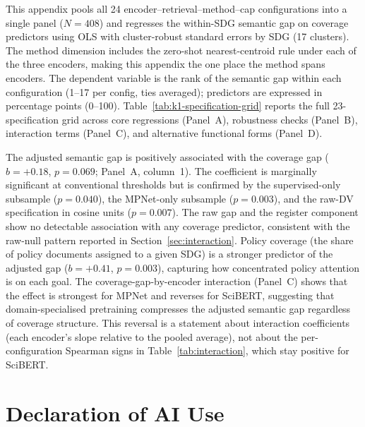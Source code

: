\documentclass[12pt,a4paper]{article}
\let\OldSection\section
\renewcommand{\section}{\clearpage\FloatBarrier\OldSection}
\begin{document}
This appendix pools all 24 encoder--retrieval--method--cap configurations into a single panel ($N = 408$) and regresses the within-SDG semantic gap on coverage predictors using OLS with cluster-robust standard errors by SDG (17 clusters). The method dimension includes the zero-shot nearest-centroid rule under each of the three encoders, making this appendix the one place the method spans encoders. The dependent variable is the rank of the semantic gap within each configuration (1--17 per config, ties averaged); predictors are expressed in percentage points (0--100). Table~\ref{tab:k1-specification-grid} reports the full 23-specification grid across core regressions (Panel~A), robustness checks (Panel~B), interaction terms (Panel~C), and alternative functional forms (Panel~D).

The adjusted semantic gap is positively associated with the coverage gap ($b = +0.18$, $p = 0.069$; Panel~A, column~1). The coefficient is marginally significant at conventional thresholds but is confirmed by the supervised-only subsample ($p = 0.040$), the MPNet-only subsample ($p = 0.003$), and the raw-DV specification in cosine units ($p = 0.007$). The raw gap and the register component show no detectable association with any coverage predictor, consistent with the raw-null pattern reported in Section~\ref{sec:interaction}. Policy coverage (the share of policy documents assigned to a given SDG) is a stronger predictor of the adjusted gap ($b = +0.41$, $p = 0.003$), capturing how concentrated policy attention is on each goal. The coverage-gap-by-encoder interaction (Panel~C) shows that the effect is strongest for MPNet and reverses for SciBERT, suggesting that domain-specialised pretraining compresses the adjusted semantic gap regardless of coverage structure. This reversal is a statement about interaction coefficients (each encoder's slope relative to the pooled average), not about the per-configuration Spearman signs in Table~\ref{tab:interaction}, which stay positive for SciBERT.

\begin{table}[ht]
\centering
\caption{Pooled OLS: coverage predictors and the within-SDG semantic gap rank across 24 configurations.}
\label{tab:k1-specification-grid}
\resizebox{\textwidth}{!}{}
\end{table}

\section{Declaration of AI Use}
\end{document}
